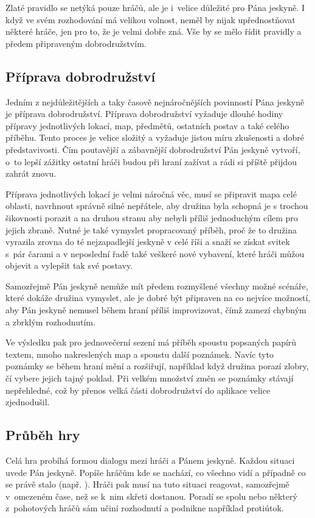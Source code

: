 \documentclass[thesis=B,czech]{resources/FITthesis}[2012/06/26]
\begin{document}
Zlaté pravidlo se netýká pouze hráčů, ale je i~velice důležité pro Pána jeskyně. I když ve svém rozhodování má velikou volnost, neměl by nijak upřednostňovat některé hráče, jen pro to, že je velmi dobře zná. Vše by se mělo řídit pravidly a předem připraveným dobrodružstvím. 


	\subsection{Příprava dobrodružství}
Jedním z nejdůležitějších a taky časově nejnáročnějších povinností Pána jeskyně je příprava dobrodružství. Příprava dobrodružství vyžaduje dlouhé hodiny přípravy jednotlivých lokací, map, předmětů, ostatních postav a také celého příběhu. Tento proces je velice složitý a vyžaduje jistou míru zkušenosti a dobré představivosti. Čím poutavější a zábavnější dobrodružství Pán jeskyně vytvoří, o~to lepší zážitky ostatní hráči budou při hraní zažívat a rádi si příště přijdou zahrát znovu. \par

Příprava jednotlivých lokací je velmi náročná věc, musí se připravit mapa celé oblasti, navrhnout správně silné nepřátele, aby družina byla schopná je s trochou šikovnosti porazit a na druhou stranu aby nebyli příliš jednoduchým cílem pro jejich zbraně. Nutné je také vymyslet propracovaný příběh, proč že to družina vyrazila zrovna do té nejzapadlejší jeskyně v celé říši a snaží se získat svitek s~pár čarami a v neposlední řadě také veškeré nové vybavení, které hráči můžou objevit a vylepšit tak své postavy. \par

Samozřejmě Pán jeskyně nemůže mít předem rozmyšlené všechny možné scénáře, které dokáže družina vymyslet, ale je dobré být připraven na co nejvíce možností, aby Pán jeskyně nemusel během hraní příliš improvizovat, čímž zamezí chybným a zbrklým rozhodnutím. \par

Ve výsledku pak pro jednovečerní sezení má příběh spoustu popsaných papírů textem, mnoho nakreslených map a spoustu další poznámek. Navíc tyto poznámky se během hraní mění a rozšiřují, například když družina porazí zlobry, čí vybere jejich tajný poklad. Při velkém množství změn se poznámky stávají nepřehledné, což by přenos velká části dobrodružství do aplikace velice zjednodušil. 
	
	\subsection{Průběh hry}
Celá hra probíhá formou dialogu mezi hráči a Pánem jeskyně. Každou situaci uvede Pán jeskyně. Popíše hráčům kde se nachází, co všechno vidí a případně co se právě stalo (např. ). Hráči pak musí na tuto situaci reagovat, samozřejmě v~omezeném čase, než se k~nim skřeti dostanou. Poradí se spolu nebo některý z~pohotových hráčů sám učiní rozhodnutí a podnikne například protiútok. \par
\end{document}
